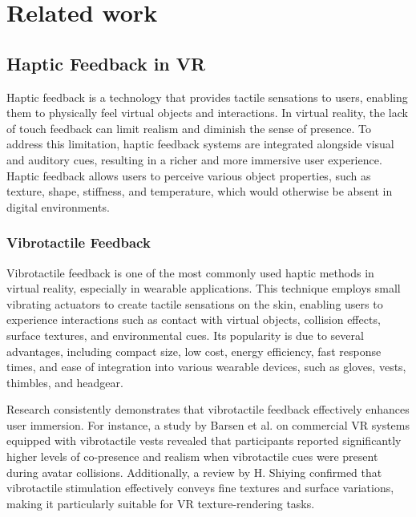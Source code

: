 \chapter{Related work} %

\label{Chapter2} %


\section{Haptic Feedback in VR}
Haptic feedback is a technology that provides tactile sensations to users, enabling them to physically feel virtual objects and interactions. In virtual reality, the lack of touch feedback can limit realism and diminish the sense of presence. To address this limitation, haptic feedback systems are integrated alongside visual and auditory cues, resulting in a richer and more immersive user experience. Haptic feedback allows users to perceive various object properties, such as texture, shape, stiffness, and temperature, which would otherwise be absent in digital environments\cite{doi:10.34133/research.0333}.

\subsection{Vibrotactile Feedback}
Vibrotactile feedback is one of the most commonly used haptic methods in virtual reality, especially in wearable applications. This technique employs small vibrating actuators to create tactile sensations on the skin, enabling users to experience interactions such as contact with virtual objects, collision effects, surface textures, and environmental cues. Its popularity is due to several advantages, including compact size, low cost, energy efficiency, fast response times, and ease of integration into various wearable devices, such as gloves, vests, thimbles, and headgear.

Research consistently demonstrates that vibrotactile feedback effectively enhances user immersion. For instance, a study by Barsen et al.\cite{10.1007/978-3-030-06134-0_25} on commercial VR systems equipped with vibrotactile vests revealed that participants reported significantly higher levels of co-presence and realism when vibrotactile cues were present during avatar collisions. Additionally, a review by H. Shiying\cite{10.54254/2753-8818/17/20240650} confirmed that vibrotactile stimulation effectively conveys fine textures and surface variations, making it particularly suitable for VR texture-rendering tasks.

